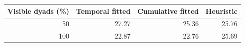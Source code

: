 \begin{tabular}{rrrr}\toprule
Visible dyads (\%) & Temporal fitted & Cumulative fitted & Heuristic \\ \midrule
50 & 27.27 & 25.36 & 25.76 \\
100 & 22.87 & 22.76 & 25.69 \\
\bottomrule\end{tabular}